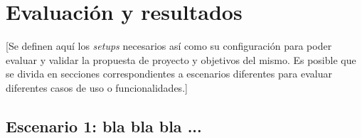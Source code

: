\chapter{Evaluación y resultados}\label{cap:evaluación}

[Se definen aquí los \textit{setups} necesarios así como su configuración para poder evaluar y validar la propuesta de proyecto y objetivos del mismo. Es posible que se divida en secciones correspondientes a escenarios diferentes para evaluar diferentes casos de uso o funcionalidades.]

\section{Escenario 1: bla bla bla ...}



